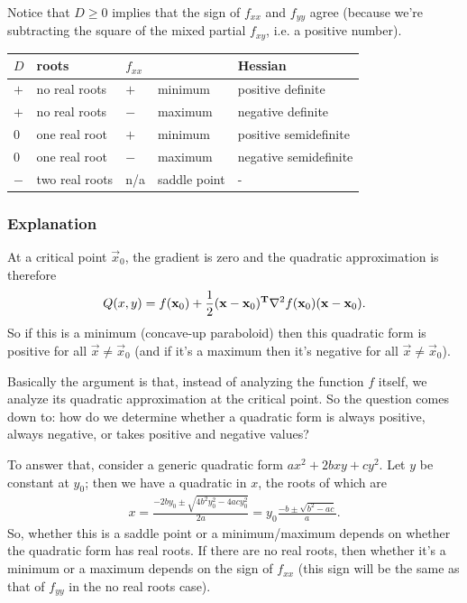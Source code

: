 Notice that $D \geq 0$ implies that the sign of $f_{xx}$ and $f_{yy}$ agree
(because we're subtracting the square of the mixed partial $f_{xy}$, i.e. a
positive number).

\begin{tabular}{ l l l l l }
  $D$    & roots          & $f_{xx}$ &  & Hessian \\
  \hline
  $+$    & no real roots  & $+$     & minimum        & positive definite \\
  $+$    & no real roots  & $-$     & maximum        & negative definite \\
  $0$    & one real root  & $+$     & minimum        & positive semidefinite \\
  $0$    & one real root  & $-$     & maximum        & negative semidefinite \\
  $-$    & two real roots & n/a     & saddle point   & - \\
\end{tabular}

\subsubsection*{Explanation}
At a critical point $\vec x_0$, the gradient is zero and the quadratic approximation is therefore
$$
Q(x, y) = f(\mathbf x_0) + \frac{1}{2}(\mathbf x - \mathbf x_0)^{\mathbf{T}} \nabla^2 f(\mathbf x_0)(\mathbf x - \mathbf x_0).
$$
So if this is a minimum (concave-up paraboloid) then this quadratic form is
positive for all $\vec x \neq \vec x_0$ (and if it's a maximum then it's
negative for all $\vec x \neq \vec x_0$).

Basically the argument is that, instead of analyzing the function $f$ itself,
we analyze its quadratic approximation at the critical point. So the question
comes down to: how do we determine whether a quadratic form is always positive,
always negative, or takes positive and negative values?

To answer that, consider a generic quadratic form $ax^2 + 2bxy + cy^2$. Let $y$
be constant at $y_0$; then we have a quadratic in $x$, the roots of which are
\begin{align*}
  x
  = \frac{-2by_0 \pm \sqrt{4b^2y_0^2 - 4acy_0^2}}{2a}
  = y_0\frac{-b \pm \sqrt{b^2 - ac}}{a}.
\end{align*}
So, whether this is a saddle point or a minimum/maximum depends on whether the
quadratic form has real roots. If there are no real roots, then whether it's a
minimum or a maximum depends on the sign of $f_{xx}$ (this sign will be the
same as that of $f_{yy}$ in the no real roots case).

